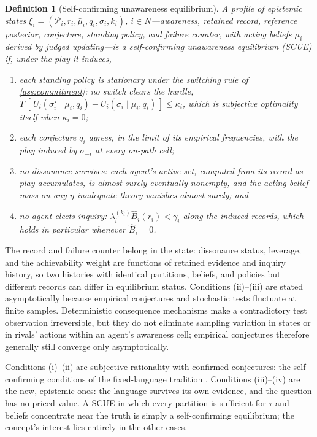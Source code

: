 \documentclass[11pt]{article}
\newtheorem{definition}[assumption]{Definition}
\theoremstyle{definition}
\begin{document}
\begin{definition}[Self-confirming unawareness equilibrium]
\label{def:scue}
A profile of epistemic states $\xi_i=(\mathcal P_i,r_i,\bar\mu_i,q_i,\sigma_i,k_i)$, $i\in N$---awareness, retained record, reference posterior, conjecture, standing policy, and failure counter, with acting beliefs $\mu_i$ derived by judged updating---is a \emph{self-confirming unawareness equilibrium} (SCUE) if, under the play it induces,
\begin{enumerate}[label=(\roman*)]
  \item each standing policy is stationary under the switching rule of \cref{ass:commitment}: no switch clears the hurdle, $T\,[\,U_i(\sigma_i^{\star}\mid\mu_i,q_i)-U_i(\sigma_i\mid\mu_i,q_i)\,]\le\kappa_i$, which is subjective optimality itself when $\kappa_i=0$;
  \item each conjecture $q_i$ agrees, in the limit of its empirical frequencies, with the play induced by $\sigma_{-i}$ at every on-path cell;
  \item no dissonance survives: each agent's active set, computed from its record as play accumulates, is almost surely eventually nonempty, and the acting-belief mass on any $\eta$-inadequate theory vanishes almost surely; and
  \item no agent elects inquiry: $\lambda_i^{(k_i)}\widehat B_i(r_i)<\gamma_i$ along the induced records, which holds in particular whenever $\widehat B_i=0$.
\end{enumerate}
\end{definition}

The record and failure counter belong in the state: dissonance status, leverage, and the achievability weight are functions of retained evidence and inquiry history, so two histories with identical partitions, beliefs, and policies but different records can differ in equilibrium status.
Conditions (ii)--(iii) are stated asymptotically because empirical conjectures and stochastic tests fluctuate at finite samples.
Deterministic consequence mechanisms make a contradictory test observation irreversible, but they do not eliminate sampling variation in states or in rivals' actions within an agent's awareness cell; empirical conjectures therefore generally still converge only asymptotically.

Conditions (i)--(ii) are subjective rationality with confirmed conjectures: the self-confirming conditions of the fixed-language tradition \citep{FudenbergLevine1993,KalaiLehrer1993b}.
Conditions (iii)--(iv) are the new, epistemic ones: the language survives its own evidence, and the question has no priced value.
A SCUE in which every partition is sufficient for $\tau$ and beliefs concentrate near the truth is simply a self-confirming equilibrium; the concept's interest lies entirely in the other cases.
\end{document}
